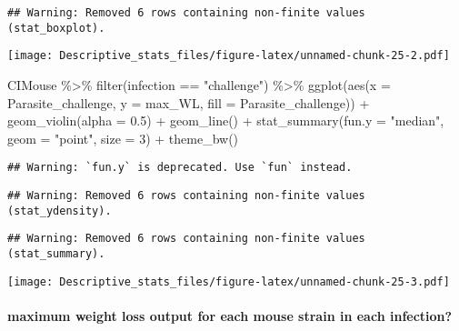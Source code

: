 \documentclass[
]{article}
\newenvironment{Shaded}{\begin{snugshade}}{\end{snugshade}}
\newcommand{\AttributeTok}[1]{\textcolor[rgb]{0.77,0.63,0.00}{#1}}
\newcommand{\DecValTok}[1]{\textcolor[rgb]{0.00,0.00,0.81}{#1}}
\newcommand{\FloatTok}[1]{\textcolor[rgb]{0.00,0.00,0.81}{#1}}
\newcommand{\FunctionTok}[1]{\textcolor[rgb]{0.00,0.00,0.00}{#1}}
\newcommand{\NormalTok}[1]{#1}
\newcommand{\SpecialCharTok}[1]{\textcolor[rgb]{0.00,0.00,0.00}{#1}}
\newcommand{\StringTok}[1]{\textcolor[rgb]{0.31,0.60,0.02}{#1}}
\begin{document}
\begin{verbatim}
## Warning: Removed 6 rows containing non-finite values (stat_boxplot).
\end{verbatim}

\texttt{[image: Descriptive\_stats\_files/figure-latex/unnamed-chunk-25-2.pdf]}

\begin{Shaded}
\begin{Highlighting}[]
\NormalTok{CIMouse  }\SpecialCharTok{\%\textgreater{}\%}
    \FunctionTok{filter}\NormalTok{(infection }\SpecialCharTok{==} \StringTok{"challenge"}\NormalTok{)  }\SpecialCharTok{\%\textgreater{}\%}
  \FunctionTok{ggplot}\NormalTok{(}\FunctionTok{aes}\NormalTok{(}\AttributeTok{x =}\NormalTok{ Parasite\_challenge, }\AttributeTok{y =}\NormalTok{ max\_WL, }\AttributeTok{fill =}\NormalTok{ Parasite\_challenge)) }\SpecialCharTok{+}
  \FunctionTok{geom\_violin}\NormalTok{(}\AttributeTok{alpha =} \FloatTok{0.5}\NormalTok{) }\SpecialCharTok{+}
    \FunctionTok{geom\_line}\NormalTok{() }\SpecialCharTok{+}
     \FunctionTok{stat\_summary}\NormalTok{(}\AttributeTok{fun.y =} \StringTok{"median"}\NormalTok{, }\AttributeTok{geom =} \StringTok{"point"}\NormalTok{, }\AttributeTok{size =} \DecValTok{3}\NormalTok{) }\SpecialCharTok{+}
    \FunctionTok{theme\_bw}\NormalTok{() }
\end{Highlighting}
\end{Shaded}

\begin{verbatim}
## Warning: `fun.y` is deprecated. Use `fun` instead.
\end{verbatim}

\begin{verbatim}
## Warning: Removed 6 rows containing non-finite values (stat_ydensity).
\end{verbatim}

\begin{verbatim}
## Warning: Removed 6 rows containing non-finite values (stat_summary).
\end{verbatim}

\texttt{[image: Descriptive\_stats\_files/figure-latex/unnamed-chunk-25-3.pdf]}

\hypertarget{maximum-weight-loss-output-for-each-mouse-strain-in-each-infection}{%
\paragraph{maximum weight loss output for each mouse strain in each
infection?}\label{maximum-weight-loss-output-for-each-mouse-strain-in-each-infection}}
\end{document}
